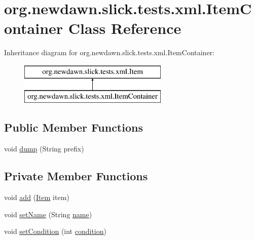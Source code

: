 \hypertarget{classorg_1_1newdawn_1_1slick_1_1tests_1_1xml_1_1_item_container}{}\section{org.\+newdawn.\+slick.\+tests.\+xml.\+Item\+Container Class Reference}
\label{classorg_1_1newdawn_1_1slick_1_1tests_1_1xml_1_1_item_container}
Inheritance diagram for org.\+newdawn.\+slick.\+tests.\+xml.\+Item\+Container\+:\begin{figure}[H]
\begin{center}
\leavevmode
\includegraphics[height=2.000000cm]{classorg_1_1newdawn_1_1slick_1_1tests_1_1xml_1_1_item_container}
\end{center}
\end{figure}
\subsection*{Public Member Functions}
\begin{DoxyCompactItemize}
\item 
void \mbox{\hyperlink{classorg_1_1newdawn_1_1slick_1_1tests_1_1xml_1_1_item_container_a4c88e3641269fe73a03a477ccb18fb68}{dump}} (String prefix)
\end{DoxyCompactItemize}
\subsection*{Private Member Functions}
\begin{DoxyCompactItemize}
\item 
void \mbox{\hyperlink{classorg_1_1newdawn_1_1slick_1_1tests_1_1xml_1_1_item_container_a1ae406b3084fa19e014a43045cdc1d5c}{add}} (\mbox{\hyperlink{classorg_1_1newdawn_1_1slick_1_1tests_1_1xml_1_1_item}{Item}} item)
\item 
void \mbox{\hyperlink{classorg_1_1newdawn_1_1slick_1_1tests_1_1xml_1_1_item_container_a3c73d9638d0579da23af1dd37b32008e}{set\+Name}} (String \mbox{\hyperlink{classorg_1_1newdawn_1_1slick_1_1tests_1_1xml_1_1_item_a5bbf1293e61bcd4d8c543caae4e3c967}{name}})
\item 
void \mbox{\hyperlink{classorg_1_1newdawn_1_1slick_1_1tests_1_1xml_1_1_item_container_ae791d328860ed0ff71bfbc42cdb91705}{set\+Condition}} (int \mbox{\hyperlink{classorg_1_1newdawn_1_1slick_1_1tests_1_1xml_1_1_item_a17a71d3cab0191fbd90b875a6483efea}{condition}})
\end{DoxyCompactItemize}
